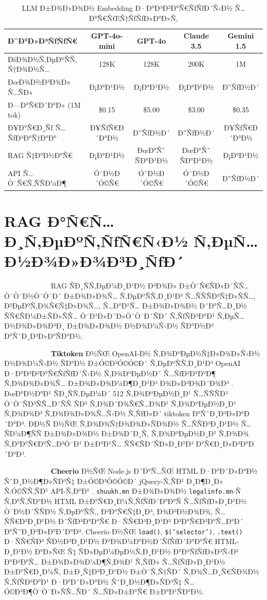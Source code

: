 \documentclass[12pt,A4]{report}
\begin{document}
\begin{table}[h]
\centering
\caption{LLM Ð±Ð¾Ð»Ð¾Ð½ Embedding Ð·Ð°Ð³Ð²Ð°Ñ€ÑƒÑƒÐ´Ñ‹Ð½ Ñ…Ð°Ñ€ÑŒÑ†ÑƒÑƒÐ»Ð°Ð»Ñ‚}
\begin{tabular}{|l|c|c|c|c|}
\hline
\textbf{Ð¨Ð°Ð»Ð³ÑƒÑƒÑ€} & \textbf{GPT-4o-mini} & \textbf{GPT-4o} &
\textbf{Claude 3.5} & \textbf{Gemini 1.5} \\
\hline
ÐšÐ¾Ð½Ñ‚ÐµÐºÑÑ‚ Ñ†Ð¾Ð½Ñ…    & 128K   & 128K   & 200K   & 1M \\
ÐœÐ¾Ð½Ð³Ð¾Ð» Ñ…ÑÐ»       & Ð¡Ð°Ð¹Ð½   & Ð¡Ð°Ð¹Ð½   & Ð¡Ð°Ð¹Ð½   & Ð”ÑƒÐ½Ð´ \\
Ð—Ð°Ñ€Ð´Ð°Ð» (1M tok)  & \$0.15 & \$5.00 & \$3.00 & \$0.35 \\
Ð¥Ð°Ñ€Ð¸Ñƒ Ñ…ÑƒÐ³Ð°Ñ†Ð°Ð°    & Ð¥ÑƒÑ€Ð´Ð°Ð½ & Ð”ÑƒÐ½Ð´   & Ð”ÑƒÐ½Ð´   & Ð¥ÑƒÑ€Ð´Ð°Ð½ \\
RAG Ñ‡Ð°Ð½Ð°Ñ€        & Ð¡Ð°Ð¹Ð½   & ÐœÐ°Ñˆ ÑÐ°Ð¹Ð½ & ÐœÐ°Ñˆ ÑÐ°Ð¹Ð½ & Ð¡Ð°Ð¹Ð½ \\
API Ñ…Ò¯Ñ€Ñ‚ÑÑÐ¼Ð¶     & Ó¨Ð½Ð´Ó©Ñ€  & Ó¨Ð½Ð´Ó©Ñ€  & Ó¨Ð½Ð´Ó©Ñ€  & Ð”ÑƒÐ½Ð´ \\
\hline
\end{tabular}
\label{tab:llm_comparison}
\end{table}

\section{RAG Ð°Ñ€Ñ…Ð¸Ñ‚ÐµÐºÑ‚ÑƒÑ€Ñ‹Ð½ Ñ‚ÐµÑ…Ð½Ð¾Ð»Ð¾Ð³Ð¸ÑƒÐ´}

\ \ \ \ \ \ \ \ \  \ \ \ \ RAG ÑÐ¸ÑÑ‚ÐµÐ¼Ð¸Ð¹Ð½ Ð³Ð¾Ð» Ð±Ò¯Ñ€ÑÐ»Ð´ÑÑ…Ò¯Ò¯Ð½Ò¯Ò¯Ð´ Ð±Ð¾Ð»Ð¾Ñ…
Ñ‚ÐµÐºÑÑ‚Ð¸Ð¹Ð³ Ñ…ÑÑÑÐ³Ñ‡Ð»ÑÑ…, Ð²ÐµÐºÑ‚Ð¾Ñ€Ñ‡Ð»Ð¾Ñ…, Ñ…Ð°Ð¹Ñ… Ð±Ð¾Ð»Ð¾Ð½ Ð´Ð°Ñ…Ð¸Ð½ ÑÑ€ÑÐ¼Ð±ÑÐ»ÑÑ…
Ò¯Ð¹Ð»Ð´Ð»Ò¯Ò¯Ð´ÑÐ´ Ñ‚ÑƒÑÐ³Ð°Ð¹ Ñ‚ÐµÑ…Ð½Ð¾Ð»Ð¾Ð³Ð¸ Ð±Ð¾Ð»Ð¾Ð½ Ð½Ð¾Ð¼Ñ‹Ð½ ÑÐ°Ð½Ð³ Ð°ÑˆÐ¸Ð³Ð»Ð°ÑÐ°Ð½.

\ \ \ \ \ \ \ \ \  \ \ \ \ \textbf{Tiktoken} Ð½ÑŒ OpenAI-Ð½ Ñ‚Ð¾ÐºÐµÐ½Ñ‡Ð»Ð¾Ð»Ñ‹Ð½
Ð½Ð¾Ð¼Ñ‹Ð½ ÑÐ°Ð½ Ð±Ó©Ð³Ó©Ó©Ð´ Ñ‚ÐµÐºÑÑ‚Ð¸Ð¹Ð³ OpenAI Ð·Ð°Ð³Ð²Ð°Ñ€ÑƒÑƒÐ´Ñ‹Ð½ Ñ‚Ð¾ÐºÐµÐ½Ð´ Ñ…ÑƒÐ²Ð°Ð°Ð¶
Ñ‚Ð¾Ð¾Ð»Ð¾Ñ… Ð±Ð¾Ð»Ð¾Ð¼Ð¶Ð¸Ð¹Ð³ Ð¾Ð»Ð³Ð¾Ð´Ð¾Ð³ \cite{tiktoken2024}. ÐœÐ°Ð½Ð°Ð¹ ÑÐ¸ÑÑ‚ÐµÐ¼Ð´
512 Ñ‚Ð¾ÐºÐµÐ½Ð¸Ð¹ Ñ…ÑÑÑÐ³ Ò¯Ò¯ÑÐ³ÑÑ…Ð´ÑÑ ÑÐ³ Ñ‚Ð¾Ð´Ð¾Ñ€Ñ…Ð¾Ð¹ Ñ‚Ð¾ÐºÐµÐ½Ð¸Ð¹ Ñ‚Ð¾Ð¾Ð³ Ñ‚Ð¾Ð¾Ð»Ð¾Ñ…Ñ‹Ð½
Ñ‚ÑƒÐ»Ð´ tiktoken Ð°ÑˆÐ¸Ð³Ð»Ð°Ð´Ð°Ð³. Ð­Ð½Ñ Ð½ÑŒ Ñ‚Ð¾Ð¾Ñ†Ð¾Ð¾Ð»ÑÐ¾Ð½ Ñ…ÑÑÐ³Ð¸Ð¹Ð½ Ñ…ÑÐ¼Ð¶ÑÑ Ð±Ð¾Ð»Ð¾Ð½
Ð±Ð¾Ð´Ð¸Ñ‚ Ñ‚Ð¾ÐºÐµÐ½Ð¸Ð¹ Ñ‚Ð¾Ð¾ Ñ‚Ð°Ð°Ñ€Ð°Ñ…Ð³Ò¯Ð¹ Ð±Ð°Ð¹Ñ… ÑÑ€ÑÐ´ÑÐ»Ð¸Ð¹Ð³ Ð°Ñ€Ð¸Ð»Ð³Ð°Ð´Ð°Ð³.

\ \ \ \ \ \ \ \ \  \ \ \ \ \textbf{Cheerio} Ð½ÑŒ Node.js Ð´Ð°Ñ…ÑŒ HTML Ð·Ð°Ð´Ð»Ð°Ð½
ÑˆÐ¸Ð½Ð¶Ð»ÑÐ³Ñ‡ Ð±Ó©Ð³Ó©Ó©Ð´ jQuery-Ñ‚ÑÐ¹ Ð¸Ð¶Ð¸Ð» Ñ‚Ó©ÑÑ‚ÑÐ¹ API-Ñ‚Ð°Ð¹ \cite{cheerio2024}.
\texttt{shuukh.mn} Ð±Ð¾Ð»Ð¾Ð½ \texttt{legalinfo.mn}-Ñ Ñ‚Ð°Ñ‚ÑÐ°Ð½ HTML
Ð±Ð°Ñ€Ð¸Ð¼Ñ‚ÑƒÑƒÐ´Ð°Ð°Ñ Ñ…ÑƒÑƒÐ»Ð¸Ð¹Ð½ Ò¯Ð½Ð´ÑÑÐ½ Ñ‚ÐµÐºÑÑ‚, Ð³Ð°Ñ€Ñ‡Ð¸Ð³, Ð¾Ð³Ð½Ð¾Ð¾, Ñ…ÑÑ€Ð³Ð¸Ð¹Ð½ Ð´ÑƒÐ³Ð°Ð°Ñ€
Ð·ÑÑ€Ð³Ð¸Ð¹Ð³ Ð³Ð°Ñ€Ð³Ð°Ñ…Ð°Ð´ Ð°ÑˆÐ¸Ð³Ð»Ð°Ð´Ð°Ð³. Cheerio Ð½ÑŒ \texttt{load()},
\texttt{\$('selector')}, \texttt{.text()} Ð·ÑÑ€ÑÐ³ ÑÐ½Ð³Ð¸Ð¹Ð½ ÐºÐ¾Ð¼Ð°Ð½Ð´ÑƒÑƒÐ´Ð°Ð°Ñ€
HTML-Ð¸Ð¹Ð½ Ð°Ð»ÑŒ Ñ‡ ÑÐ»ÐµÐ¼ÐµÐ½Ñ‚Ð¸Ð¹Ð½ Ð°Ð³ÑƒÑƒÐ»Ð³Ñ‹Ð³ Ð°Ð²Ð°Ñ… Ð±Ð¾Ð»Ð¾Ð¼Ð¶Ñ‚Ð¾Ð¹ Ñ‚ÑƒÐ» Ñ…ÑƒÑƒÐ»Ð¸Ð¹Ð½
Ð±Ð°Ñ€Ð¸Ð¼Ñ‚ Ð±Ð¸Ñ‡Ð³Ð¸Ð¹Ð½ Ð±Ò¯Ñ‚Ñ†ÑÐ´ Ñ‚Ð¾Ñ…Ð¸Ñ€ÑÐ¾Ð½ Ñ‚ÑƒÑÐ³Ð°Ð¹ Ð·Ð°Ð´Ð»Ð°Ð½ ÑˆÐ¸Ð½Ð¶Ð»ÑÐ³Ñ‡
Ñ…Ó©Ð³Ð¶Ò¯Ò¯Ð»ÑÑ…ÑÐ´ Ñ…ÑÐ»Ð±Ð°Ñ€ Ð±Ð°Ð¹ÑÐ°Ð½.
\end{document}
